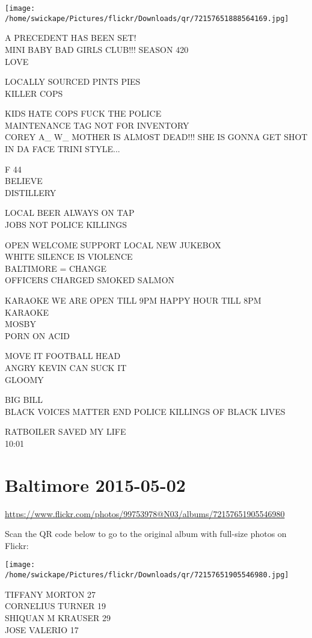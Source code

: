 \documentclass[10pt,letterpaper]{article}
\begin{document}
\texttt{[image: /home/swickape/Pictures/flickr/Downloads/qr/72157651888564169.jpg]}


A PRECEDENT HAS BEEN SET!\\
MINI BABY BAD GIRLS CLUB!!! SEASON 420\\
LOVE

LOCALLY SOURCED PINTS PIES\\
KILLER COPS

KIDS HATE COPS FUCK THE POLICE\\
MAINTENANCE TAG NOT FOR INVENTORY\\
COREY A\_ W\_ MOTHER IS ALMOST DEAD!!!  SHE IS GONNA GET SHOT IN DA FACE TRINI STYLE...

F 44\\
BELIEVE\\
DISTILLERY

LOCAL BEER ALWAYS ON TAP\\
JOBS NOT POLICE KILLINGS

OPEN WELCOME SUPPORT LOCAL NEW JUKEBOX\\
WHITE SILENCE IS VIOLENCE\\
BALTIMORE = CHANGE\\
OFFICERS CHARGED SMOKED SALMON

KARAOKE WE ARE OPEN TILL 9PM HAPPY HOUR TILL 8PM KARAOKE\\
MOSBY\\
PORN ON ACID

MOVE IT FOOTBALL HEAD\\
ANGRY KEVIN CAN SUCK IT\\
GLOOMY

BIG BILL\\
BLACK VOICES MATTER END POLICE KILLINGS OF BLACK LIVES

RATBOILER SAVED MY LIFE\\
10:01


\section*{Baltimore 2015-05-02}

\url{https://www.flickr.com/photos/99753978@N03/albums/72157651905546980}

Scan the QR code below to go to the original album with full-size photos on Flickr:

\texttt{[image: /home/swickape/Pictures/flickr/Downloads/qr/72157651905546980.jpg]}


TIFFANY MORTON 27\\
CORNELIUS TURNER 19\\
SHIQUAN M KRAUSER 29\\
JOSE VALERIO 17
\end{document}
